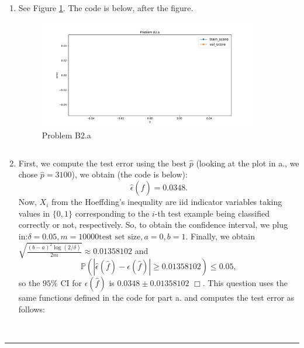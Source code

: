 \documentclass{article}
\newcommand{\1}{\mathbf{1}}
\renewcommand{\P}{\mathbb{P}}
\begin{document}
\begin{enumerate}
    \item See Figure \ref{figure:b2.a}. The code is below, after the figure.
         \begin{figure}[h!]
            \centering
            \includegraphics[width=0.9\textwidth]{code/b2_a.pdf}
            \caption{Problem B2.a}
            \label{figure:b2.a}
         \end{figure}
         
         \inputminted{python}{code/B2_a.py}
          \caption{Code for B2.a}
          \label{listing:b2.a}
    \item First, we compute the test error using the best $\widehat p$ (looking at the plot in a., we chose $\widehat p = 3100$), we obtain (the code is below):
    $$
    \widehat{\epsilon}(\widehat{f}) = 0.0348.
    $$
    Now, $X_i$ from the Hoeffding's inequality are iid indicator variables taking values in $\{0,1\}$ corresponding to the $i$-th test example being classified correctly or not, respectively. So, to obtain the confidence interval, we plug in:$\delta = 0.05, m = 10000 \text{test set size}, a=0, b=1$. Finally, we obtain $\sqrt{\frac{(b-a)^2 \log(2/\delta)}{2m}} \approx 0.01358102$ and
    $$
    \P \left( \left|\widehat{\epsilon}(\widehat{f})  - \epsilon(\widehat{f}) \right| \geq 0.01358102 \right)
                \leq 0.05,
    $$
    so the $95\%$ CI for $\epsilon(\widehat{f})$ is  $\boxed{0.0348 \pm 0.01358102}$ $\Box$.
    This question uses the same functions defined in the code for part a. and computes the test error as follows:
    \begin{verbatim}
    
    \end{verbatim}
    
\end{enumerate}
\noindent\rule{\textwidth}{1pt}
\end{document}
